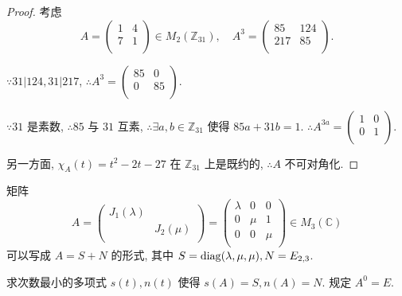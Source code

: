 \documentclass[color=black,device=normal,lang=cn,mode=geye]{elegantnote}
\begin{document}
\begin{proof}
    考虑
    \[A=\begin{pmatrix}
        1 & 4 \\
        7 & 1 \\
    \end{pmatrix}\in M_2(\mathbb{Z}_{31}),\quad A^3=\begin{pmatrix}
        85 & 124 \\
        217 & 85 \\
    \end{pmatrix}.\]

    $\because31|124,31|217$, $\therefore A^3=\begin{pmatrix}
        85 & 0 \\
        0 & 85 \\
    \end{pmatrix}$.

    $\because31$ 是素数, $\therefore85$ 与 $31$ 互素, $\therefore\exists a,b\in\mathbb{Z}_{31}$ 使得 $85a+31b=1$. $\therefore A^{3a}=\begin{pmatrix}
        1 & 0 \\
        0 & 1 \\
    \end{pmatrix}$.

    另一方面, $\chi_A(t)=t^2-2t-27$ 在 $\mathbb{Z}_{31}$ 上是既约的, $\therefore A$ 不可对角化.
\end{proof}
\addtocounter{exercise}{2}
\begin{exercise}%
    矩阵
    \[A=\begin{pmatrix}
        J_1(\lambda) \\
        & J_2(\mu) \\
    \end{pmatrix}=\begin{pmatrix}
        \lambda & 0 & 0 \\
        0 & \mu & 1 \\
        0 & 0 & \mu \\
    \end{pmatrix}\in M_3(\mathbb{C})\]
    可以写成 $A=S+N$ 的形式, 其中 $S=\operatorname{diag}(\lambda,\mu,\mu),N=E_{2,3}$.

    求次数最小的多项式 $s(t),n(t)$ 使得 $s(A)=S,n(A)=N$. 规定 $A^0=E$.
\end{exercise}
\end{document}
